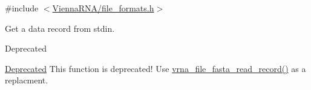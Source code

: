 {\ttfamily \#include $<$\hyperlink{file__formats_8h}{Vienna\+R\+N\+A/file\+\_\+formats.\+h}$>$}



Get a data record from stdin. 

\begin{DoxyRefDesc}{Deprecated}
\item[\hyperlink{deprecated__deprecated000061}{Deprecated}]This function is deprecated! Use \hyperlink{group__file__utils_ga8cfb7e271efc9e1f34640acb85475639}{vrna\+\_\+file\+\_\+fasta\+\_\+read\+\_\+record()} as a replacment.\end{DoxyRefDesc}
